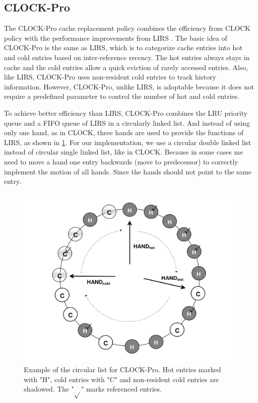 \documentclass[
	12pt,
	a4paper,
	abstract,
	bibliography=totoc,
	chapterprefix,
	headings=openright,
	numbers=endperiod,
	parskip=half,
	twoside,
]{scrreprt}
\begin{document}
\subsection{CLOCK-Pro}

The CLOCK-Pro cache replacement policy \cite{jiang2005clock} combines the efficiency from CLOCK policy with the performance improvements from LIRS 
\cite{10.1145/511399.511340}.
The basic idea of CLOCK-Pro is the same as LIRS, which is to categorize cache entries into hot and cold entries based on inter-reference recency.
The hot entries always stays in cache and the cold entries allow a quick eviction of rarely accessed entries.
Also, like LIRS, CLOCK-Pro uses non-resident cold entries to track history information.
However, CLOCK-Pro, unlike LIRS, is adoptable because it does not require a predefined parameter to control the number of hot and cold entries.

To achieve better efficiency than LIRS, CLOCK-Pro combines the LRU priority queue and a FIFO queue of LIRS in a circularly linked list.
And instead of using only one hand, as in CLOCK, three hands are used to provide the functions of LIRS, 
as shown in \ref{fig:clock in clock-pro}.
For our implementation, we use a circular double linked list instead of circular single linked list, like in CLOCK.
Because in some cases me need to move a hand one entry backwards (move to predecessor) to correctly implement the motion of all hands.
Since the hands should not point to the same entry.

\begin{figure}[ht]
	\centering
	\includegraphics[scale=0.2]{clock_pro.png}
	\caption{Example of the circular list for CLOCK-Pro. Hot entries marked with "H", cold entries with "C" and non-resident cold entries are shadowed.
	The "$\sqrt{}$" marks referenced entries.}
		\label{fig:clock in clock-pro}
\end{figure}
\end{document}
